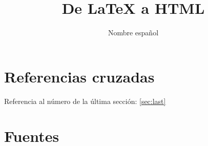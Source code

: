 \documentclass[12pt,a4paper,twoside]{article}
\title{De LaTeX a HTML}
\author{Nombre español}
\begin{document}
\maketitle



\ifdefined\HCode\else
	\tableofcontents
\fi


%
%
%
%
%

%
%

\section{Referencias cruzadas}


Referencia al número de la última sección: \ref{sec:last} %

\section{Fuentes}
\end{document}
